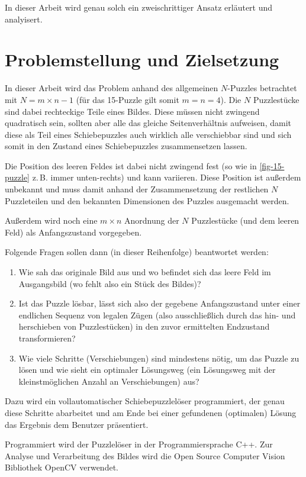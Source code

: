\documentclass{whswinvcbook}
\begin{document}
In dieser Arbeit wird genau solch ein zweischrittiger Ansatz erläutert und analyisert.
\section{Problemstellung und Zielsetzung}
In dieser Arbeit wird das Problem anhand des allgemeinen $N$-Puzzles betrachtet mit $N=m\times n-1$ (für das 15-Puzzle gilt somit $m=n=4$).
Die $N$ Puzzlestücke sind dabei rechteckige Teile eines Bildes. Diese müssen nicht zwingend quadratisch sein, sollten aber alle das gleiche Seitenverhältnis aufweisen, damit diese als Teil eines Schiebepuzzles auch wirklich alle verschiebbar sind und sich somit in den Zustand eines Schiebepuzzles zusammensetzen lassen.

Die Position des leeren Feldes ist dabei nicht zwingend fest (so wie in \ref{fig-15-puzzle} z.\,B. immer unten-rechts) und kann variieren. Diese Position ist außerdem unbekannt und muss damit anhand der Zusammensetzung der restlichen $N$ Puzzleteilen und den bekannten Dimensionen des Puzzles ausgemacht werden.

Außerdem wird noch eine $m\times n$ Anordnung der $N$ Puzzlestücke (und dem leeren Feld) als Anfangszustand vorgegeben.

Folgende Fragen sollen dann (in dieser Reihenfolge) beantwortet werden:
\begin{enumerate}
    \item Wie sah das originale Bild aus und wo befindet sich das leere Feld im Ausgangsbild (wo fehlt also ein Stück des Bildes)?
    \item Ist das Puzzle lösbar, lässt sich also der gegebene Anfangszustand unter einer endlichen Sequenz von legalen Zügen (also ausschließlich durch das hin- und herschieben von Puzzlestücken) in den zuvor ermittelten Endzustand transformieren?
    \item Wie viele Schritte (Verschiebungen) sind mindestens nötig, um das Puzzle zu lösen und wie sieht ein optimaler Lösungsweg (ein Lösungsweg mit der kleinstmöglichen Anzahl an Verschiebungen) aus?
\end{enumerate}
Dazu wird ein vollautomatischer Schiebepuzzlelöser programmiert, der genau diese Schritte abarbeitet und am Ende bei einer gefundenen (optimalen) Lösung das Ergebnis dem Benutzer präsentiert.

Programmiert wird der Puzzlelöser in der Programmiersprache C++. Zur Analyse und Verarbeitung des Bildes wird die Open Source Computer Vision Bibliothek OpenCV verwendet.
\end{document}

